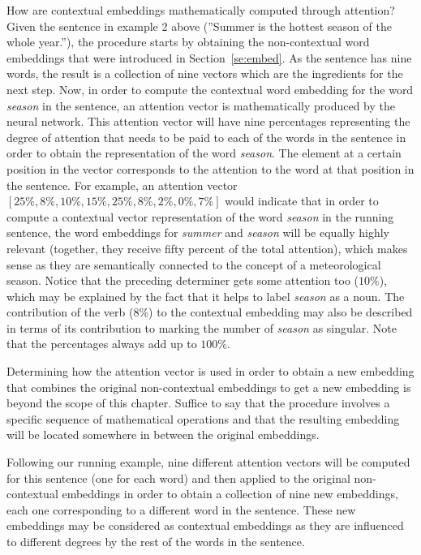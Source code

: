 \documentclass[output=paper,colorlinks,citecolor=brown]{langscibook}
\begin{document}
How are contextual embeddings mathematically computed through attention? Given the sentence in example 2 above (''Summer is the hottest season of the whole year.''), the procedure starts by obtaining the non-contextual word embeddings that were introduced in Section~\ref{se:embed}. As the sentence has nine words, the result is a collection of nine vectors which are the ingredients for the next step. Now, in order to compute the contextual word embedding for the word \emph{season} in the sentence, an attention vector is mathematically produced by the neural network. This attention vector will have nine percentages representing the degree of attention that needs to be paid to each of the words in the sentence in order to obtain the representation of the word \emph{season}. The element at a certain position in the vector corresponds to the attention to the word at that position in the sentence. For example, an attention vector $[25\%, 8\%, 10\%, 15\%, 25\%, 8\%, 2\%, 0\%, 7\%]$ would indicate that in order to compute a contextual vector representation of the word \emph{season} in the running sentence, the word embeddings for \emph{summer} and \emph{season} will be equally highly relevant (together, they receive fifty percent of the total attention), which makes sense as they are semantically connected to the concept of a meteorological season. Notice that the preceding determiner gets some attention too ($10\%$), which may be explained by the fact that it helps to label \emph{season} as a noun. The contribution of the verb ($8\%$) to the contextual embedding may also be described in terms of its contribution to marking the number of \emph{season} as singular. Note that the percentages always add up to $100\%$.

Determining how the attention vector is used in order to obtain a new embedding that combines the original non-contextual embeddings to get a new embedding is beyond the scope of this chapter. Suffice to say that the procedure involves a specific sequence of mathematical operations and that the resulting embedding will be located somewhere in between the original embeddings.

Following our running example, nine different attention vectors will be computed for this sentence (one for each word) and then applied to the original non-contextual embeddings in order to obtain a collection of nine new embeddings, each one corresponding to a different word in the sentence. These new embeddings may be considered as contextual embeddings as they are influenced 
to different degrees by the rest of the words in the sentence.
\end{document}
